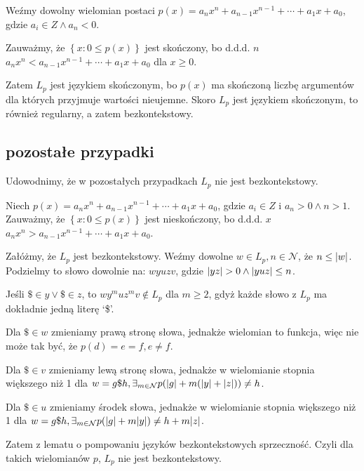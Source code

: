 \documentclass{article}
\theoremstyle{definition}
\theoremstyle{remark}
\begin{document}
Weźmy dowolny wielomian postaci \( p(x)=a_n x^n + a_{n-1}x^{n-1} + \cdots + a_1x + a_0\), gdzie \(a_i \in Z \land a_n < 0\).

Zauważmy, że \(\left\{ x: 0 \leq p(x) \right\}\) jest skończony, bo d.d.d. \(n\) \(a_n x^n < a_{n-1}x^{n-1} + \cdots + a_1x + a_0\) dla \(x \geq 0\).

Zatem \(L_p\) jest językiem skończonym, bo \(p(x)\) ma skończoną liczbę argumentów
dla których przyjmuje wartości nieujemne.
Skoro \(L_p\) jest językiem skończonym, to również regularny, a zatem bezkontekstowy.

\subsection{pozostałe przypadki}

Udowodnimy, że w pozostałych przypadkach \(L_p\) nie jest bezkontekstowy.

Niech \(p(x)=a_n x^n + a_{n-1}x^{n-1} + \cdots + a_1x + a_0\), gdzie \(a_i \in Z\) i \(a_n > 0 \land n>1\).
Zauważmy, że \(\left\{ x: 0 \leq p(x) \right\}\) jest nieskończony,
bo d.d.d. \(x\) \(a_n x^n > a_{n-1}x^{n-1} + \cdots + a_1x + a_0\).

Załóżmy, że \(L_p\) jest bezkontekstowy. Weźmy dowolne \(w \in L_p, n \in \mathcal{N}\),
że \(n \leq \abs{w}\).
Podzielmy to słowo dowolnie na:
\(w y u z v\), gdzie \(\abs{yz} > 0 \land \abs{yuz} \leq n\).

Jeśli \(\$ \in y \lor \$ \in z\), to \(w y^m u z^m v \not \in L_p\) dla \(m \geq 2\), gdyż każde słowo
z \(L_p\) ma dokładnie jedną literę `\$'.

Dla \(\$ \in w\) zmieniamy prawą stronę słowa, jednakże wielomian to funkcja,
więc nie może tak być, że \(p(d)=e=f, e \neq f\).

Dla \(\$ \in v\) zmieniamy lewą stronę słowa, jednakże w wielomianie stopnia większego niż 1
dla \(w = g \$ h, \exists_{m \in \mathcal{N}} p(\abs{g} + m(\abs{y} + \abs{z})) \neq h\).

Dla \(\$ \in u\) zmieniamy środek słowa, jednakże w wielomianie stopnia większego niż 1
dla \(w = g \$ h, \exists_{m \in \mathcal{N}} p(\abs{g} + m \abs{y}) \neq h + m \abs{z}\).

Zatem z lematu o pompowaniu języków bezkontekstowych sprzeczność.
Czyli dla takich wielomianów \(p\), \(L_p\) nie jest bezkontekstowy.
\end{document}
